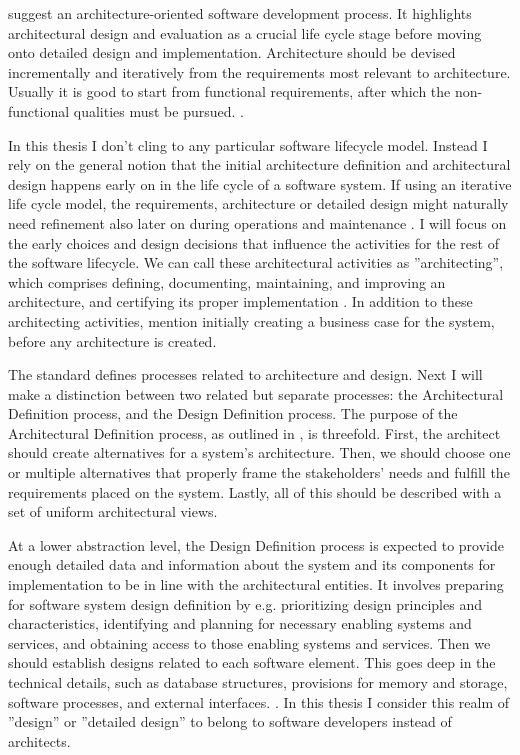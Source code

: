 \documentclass[utf8,english]{gradu3}
\begin{document}
\textcite{Koskimies2005} suggest an architecture-oriented software development
process. It highlights architectural design and evaluation as a crucial life
cycle stage before moving onto detailed design and implementation. Architecture
should be devised incrementally and iteratively from the requirements most
relevant to architecture. Usually it is good to start from functional
requirements, after which the non-functional qualities must be pursued.
\parencite{Koskimies2005}.

In this thesis I don't cling to any particular software lifecycle model.
Instead I rely on the general notion that the initial architecture definition
and architectural design happens early on in the life cycle of a software
system. If using an iterative life cycle model, the requirements, architecture or detailed design might naturally need
refinement also later on during operations and maintenance \parencite{IEEE12207}.
I will focus on the early
choices and design decisions that influence the activities for the rest of the
software lifecycle. We can call these architectural activities as
''architecting'', which comprises defining, documenting, maintaining, and improving an architecture,
and certifying its proper implementation \parencite[3]{IEEE42010}.
In addition to these architecting activities,
\textcite[12]{Bass1998} mention initially creating a business case for the system, before any architecture is created.

The standard \textcite{IEEE12207} defines processes related to architecture and design. Next
I will make a distinction between two related but separate processes: the
Architectural Definition process, and the Design Definition process.
The purpose of the Architectural Definition process, as outlined in
\textcite[66]{IEEE12207}, is threefold. First, the architect should create
alternatives for a system's architecture. Then, we should choose one or
multiple alternatives that properly frame the stakeholders' needs and fulfill
the requirements placed on the system. Lastly, all of this should be described
with a set of uniform architectural views.

At a lower abstraction level, the Design Definition process
\parencite[71]{IEEE12207} is expected to provide enough detailed data and
information about the system and its components for implementation to be in line
with the architectural entities. It involves preparing for software system
design definition by e.g. prioritizing design principles and characteristics,
identifying and planning for necessary enabling systems and services, and
obtaining access to those enabling systems and services. Then we should establish
designs related to each software element. This goes deep in the technical
details, such as database structures, provisions for memory and storage,
software processes, and external interfaces. \parencite[72]{IEEE12207}. In this
thesis I consider this realm of ''design'' or ''detailed design'' to belong to
software developers instead of architects.
\end{document}
